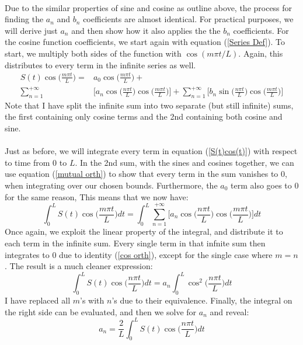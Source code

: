 \documentclass[12pt,letterpaper]{article}
\begin{document}
\paragraph*{}Due to the similar properties of sine and cosine as outline above, the process for finding the $a_n$ and $b_n$ coefficients are almost identical. For practical purposes, we will derive just $a_n$ and then show how it also applies the the $b_n$ coefficients. For the cosine function coefficients, we start again with equation (\ref{Series Def}). To start, we multiply both sides of the function with $\cos(m\pi t/L)$. Again, this distributes to every term in the infinite series as well.
\begin{equation}
\label{S(t)cos(t)}
\begin{split}
S(t)\cos\Big(\frac{m\pi t}{L}\Big) = &  a_0\cos\Big(\frac{m\pi t}{L}\Big) + \\
\sum_{n=1}^{+\infty} & \Bigg[ a_n \cos\Big(\frac{n\pi t}{L}\Big)\cos\Big(\frac{m\pi t}{L}\Big) \Bigg] +  
\sum_{n=1}^{+\infty} \Bigg[ b_n \sin\Big(\frac{n\pi t}{L}\Big)\cos\Big(\frac{m\pi t}{L}\Big) \Bigg]
\end{split}
\end{equation}
Note that I have split the infinite sum into two separate (but still infinite) sums, the first containing only cosine terms and the 2nd containing both cosine and sine.
\paragraph*{}Just as before, we will integrate every term in equation (\ref{S(t)cos(t)}) with respect to time from $0$ to $L$. In the 2nd sum, with the sines and cosines together, we can use equation (\ref{mutual orth}) to show that every term in the sum vanishes to $0$, when integrating over our chosen bounds. Furthermore, the $a_0$ term also goes to $0$ for the same reason, This means that we now have:
\begin{equation}
\int_{0}^{L}S(t)\cos\Big(\frac{m\pi t}{L}\Big)dt = 
\int_{0}^{L}\sum_{n=1}^{+\infty} \Bigg[ a_n \cos\Big(\frac{n\pi t}{L}\Big)\cos\Big(\frac{m\pi t}{L}\Big) \Bigg]dt
\end{equation}
Once again, we exploit the linear property of the integral, and distribute it to each term in the infinite sum. Every single term in that infnite sum then integrates to $0$ due to identity (\ref{cos orth}), except for the single case where $m = n$. The result is a much cleaner expression:
\begin{equation}
\int_{0}^{L}S(t)\cos\Big(\frac{n\pi t}{L}\Big)dt = 
a_n\int_{0}^{L} \cos^2\Big(\frac{n\pi t}{L}\Big)dt
\end{equation}
I have replaced all $m$'s with $n$'s due to their equivalence. Finally, the integral on the right side can be evaluated, and then we solve for $a_n$ and reveal:
\begin{equation}
\label{a_n}
a_n = \frac{2}{L}\int_{0}^{L}S(t)\cos\Big(\frac{n\pi t}{L}\Big)dt
\end{equation}
\end{document}
